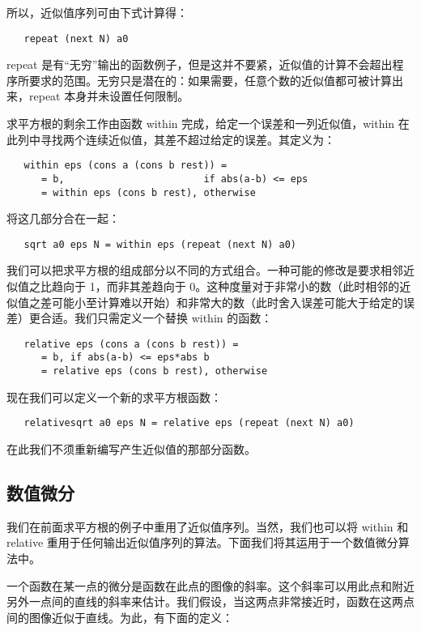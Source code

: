 \documentclass[12pt,a4paper]{article}
\begin{document}
所以，近似值序列可由下式计算得：

\begin{verbatim}
   repeat (next N) a0
\end{verbatim}

repeat 是有``无穷''输出的函数例子，但是这并不要紧，近似值的计算不会超出程序所要求的范围。无穷只是潜在的：如果需要，任意个数的近似值都可被计算出来，repeat 本身并未设置任何限制。

求平方根的剩余工作由函数 within 完成，给定一个误差和一列近似值，within 在此列中寻找两个连续近似值，其差不超过给定的误差。其定义为：

\begin{verbatim}
   within eps (cons a (cons b rest)) =
      = b,                        if abs(a-b) <= eps
      = within eps (cons b rest), otherwise
\end{verbatim}

将这几部分合在一起：

\begin{verbatim}
   sqrt a0 eps N = within eps (repeat (next N) a0)
\end{verbatim}

我们可以把求平方根的组成部分以不同的方式组合。一种可能的修改是要求相邻近似值之比趋向于 1，而非其差趋向于 0。这种度量对于非常小的数（此时相邻的近似值之差可能小至计算难以开始）和非常大的数（此时舍入误差可能大于给定的误差）更合适。我们只需定义一个替换 within 的函数：

\begin{verbatim}
   relative eps (cons a (cons b rest)) =
      = b, if abs(a-b) <= eps*abs b
      = relative eps (cons b rest), otherwise
\end{verbatim}

现在我们可以定义一个新的求平方根函数：

\begin{verbatim}
   relativesqrt a0 eps N = relative eps (repeat (next N) a0)
\end{verbatim}

在此我们不须重新编写产生近似值的那部分函数。

\subsection{数值微分}

我们在前面求平方根的例子中重用了近似值序列。当然，我们也可以将 within 和 relative 重用于任何输出近似值序列的算法。下面我们将其运用于一个数值微分算法中。

一个函数在某一点的微分是函数在此点的图像的斜率。这个斜率可以用此点和附近另外一点间的直线的斜率来估计。我们假设，当这两点非常接近时，函数在这两点间的图像近似于直线。为此，有下面的定义：
\end{document}
